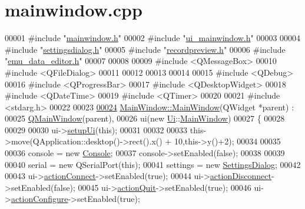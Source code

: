 \hypertarget{a00109_source}{\section{mainwindow.\+cpp}
\label{a00109_source}
}

\begin{DoxyCode}
00001 \textcolor{preprocessor}{#include "\hyperlink{a00110}{mainwindow.h}"}
00002 \textcolor{preprocessor}{#include "\hyperlink{a00139}{ui\_mainwindow.h}"}
00003 
00004 \textcolor{preprocessor}{#include "\hyperlink{a00132}{settingsdialog.h}"}
00005 \textcolor{preprocessor}{#include "\hyperlink{a00130}{recordpreview.h}"}
00006 \textcolor{preprocessor}{#include "\hyperlink{a00094}{emu\_data\_editor.h}"}
00007 
00008 
00009 \textcolor{preprocessor}{#include <QMessageBox>}
00010 \textcolor{preprocessor}{#include <QFileDialog>}
00011 
00012 
00013 
00014 
00015 \textcolor{preprocessor}{#include <QDebug>}
00016 \textcolor{preprocessor}{#include <QProgressBar>}
00017 \textcolor{preprocessor}{#include <QDesktopWidget>}
00018 \textcolor{preprocessor}{#include <QDateTime>}
00019 \textcolor{preprocessor}{#include <QTimer>}
00020 
00021 \textcolor{preprocessor}{#include <stdarg.h>}
00022 
00023 
\hypertarget{a00109_source_l00024}{}\hyperlink{a00017_a8b244be8b7b7db1b08de2a2acb9409db}{00024} \hyperlink{a00017_a8b244be8b7b7db1b08de2a2acb9409db}{MainWindow::MainWindow}(QWidget *parent) :
00025     \hyperlink{a00058}{QMainWindow}(parent),
00026     ui(new \hyperlink{a00145}{Ui}::\hyperlink{a00017}{MainWindow})
00027 \{
00028 
00029 
00030     ui->\hyperlink{a00080_acf4a0872c4c77d8f43a2ec66ed849b58}{setupUi}(\textcolor{keyword}{this});
00031 
00032 
00033     this->move(QApplication::desktop()->rect().x() + 10,this->y()+2);
00034 
00035 
00036         console = \textcolor{keyword}{new} \hyperlink{a00005}{Console};
00037         console->setEnabled(\textcolor{keyword}{false});
00038 
00039 
00040         serial = \textcolor{keyword}{new} QSerialPort(\textcolor{keyword}{this});
00041         settings = \textcolor{keyword}{new} \hyperlink{a00075}{SettingsDialog};
00042 
00043           ui->\hyperlink{a00080_aa0785566311fc48271690fb68b1d4c5f}{actionConnect}->setEnabled(\textcolor{keyword}{true});
00044           ui->\hyperlink{a00080_a8a16b3aef75b279eaaa887152d2f746b}{actionDisconnect}->setEnabled(\textcolor{keyword}{false});
00045           ui->\hyperlink{a00080_a188c243f36a2dbc10e4e2a0ad94273b1}{actionQuit}->setEnabled(\textcolor{keyword}{true});
00046           ui->\hyperlink{a00080_a3860abde3cfd3f6170e28fddde73f11e}{actionConfigure}->setEnabled(\textcolor{keyword}{true});

\end{DoxyCode}
